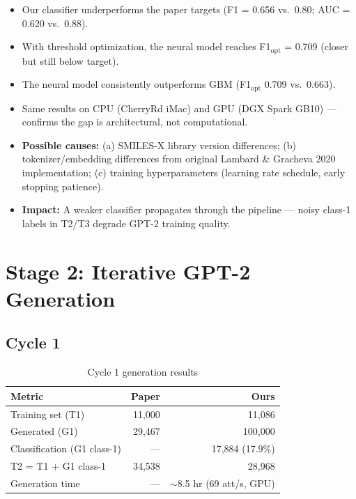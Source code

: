 \documentclass[11pt]{article}
\begin{document}
\begin{itemize}[leftmargin=*]
    \item Our classifier underperforms the paper targets (F1 = 0.656 vs.\ 0.80; AUC = 0.620 vs.\ 0.88).
    \item With threshold optimization, the neural model reaches F1$_\mathrm{opt}$ = 0.709 (closer but still below target).
    \item The neural model consistently outperforms GBM (F1$_\mathrm{opt}$ 0.709 vs.\ 0.663).
    \item Same results on CPU (CherryRd iMac) and GPU (DGX Spark GB10) --- confirms the gap is architectural, not computational.
    \item \textbf{Possible causes:} (a) SMILES-X library version differences; (b) tokenizer/embedding differences from original Lambard \& Gracheva 2020 implementation; (c) training hyperparameters (learning rate schedule, early stopping patience).
    \item \textbf{Impact:} A weaker classifier propagates through the pipeline --- noisy class-1 labels in T2/T3 degrade GPT-2 training quality.
\end{itemize}

\section{Stage 2: Iterative GPT-2 Generation}

\subsection{Cycle 1}

\begin{table}[H]
\centering
\caption{Cycle 1 generation results}
\label{tab:cycle1}
\begin{tabular}{@{}lrr@{}}
\toprule
\textbf{Metric} & \textcolor{paperblue}{\textbf{Paper}} & \textcolor{oursred}{\textbf{Ours}} \\
\midrule
Training set (T1) & 11,000 & 11,086 \\
Generated (G1) & 29,467 & 100,000 \\
Classification (G1 class-1) & --- & 17,884 (17.9\%) \\
T2 = T1 + G1 class-1 & 34,538 & 28,968 \\
Generation time & --- & $\sim$8.5 hr (69 att/s, GPU) \\
\bottomrule
\end{tabular}
\end{table}
\end{document}
